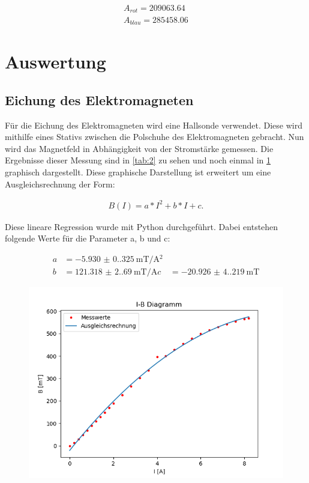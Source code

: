 \begin{align} \label{wauf}
    A_{rot} =  209063.64 \\
    A_{blau} =  285458.06 
\end{align}

\section{Auswertung}

\subsection{Eichung des Elektromagneten}

Für die Eichung des Elektromagneten wird eine Hallsonde verwendet. Diese wird mithilfe eines Stativs zwischen die Polschuhe des Elektromagneten gebracht. Nun wird das Magnetfeld in Abhängigkeit von der Stromstärke gemessen.
Die Ergebnisse dieser Messung sind in \ref{tab:2} zu sehen und noch einmal in \ref{fig:magnet} graphisch dargestellt. Diese graphische Darstellung ist erweitert um eine Ausgleichsrechnung der Form:

\begin{align} \label{B}
    B(I) = a * I^2 + b * I + c.
\end{align}

\noindent Diese lineare Regression wurde mit Python durchgeführt. Dabei entstehen folgende Werte für die Parameter a, b und c:

\begin{align}
    a &= \SI[separate-uncertainty=true]{-5.930(0.325)}{\milli\tesla \per \ampere^2} \\
    b &= \SI[separate-uncertainty=true]{121.318(2.690)}{\milli\tesla \per \ampere}
    c &= \SI[separate-uncertainty=true]{-20.926(4.219)}{\milli\tesla}
\end{align}

\begin{figure}[H]
    \centering
    \includegraphics{magnet.png}
    \label{fig:magnet}
\end{figure}

